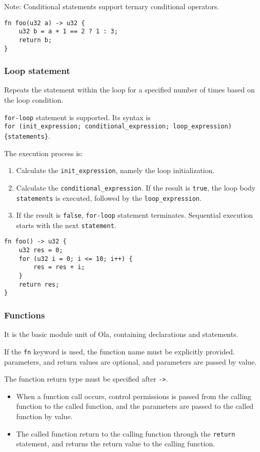 Note: Conditional statements support ternary conditional operators.

\begin{lstlisting}
fn foo(u32 a) -> u32 {
    u32 b = a + 1 == 2 ? 1 : 3;
    return b;
}
\end{lstlisting}

\subsubsection*{Loop statement}

Repeats the statement within the loop for a specified number of times based on the loop condition.

\verb|for-loop| statement is supported. Its syntax is \\
\verb|for (init_expression; conditional_expression; loop_expression) {statements}|.

The execution process is:
\begin{enumerate}
    \item Calculate the \verb|init_expression|, namely the loop initialization.
    \item Calculate the \verb|conditional_expression|. If the result is \verb|true|, the loop body \verb|statements| is executed, followed by the \verb|loop_expression|.
    \item If the result is \verb|false|, \verb|for-loop| statement terminates. Sequential execution starts with the next \verb|statement|.
\end{enumerate}

\begin{lstlisting}
fn foo() -> u32 {
    u32 res = 0;
    for (u32 i = 0; i <= 10; i++) {
        res = res + i;
    }
    return res;
}
\end{lstlisting}

\subsubsection{Functions}

It is the basic module unit of Ola, containing declarations and statements.

If the \verb|fn| keyword is used, the function name must be explicitly provided. parameters, and return values are optional, and parameters are passed by value.

The function return type must be specified after \verb|->|.

\begin{itemize}
    \item When a function call occurs, control permissions is passed from the calling function to the called function, and the parameters are passed to the called function by value. 
    \item The called function return to the calling function through the \verb|return| statement, and returns the return value to the calling function.
\end{itemize}

